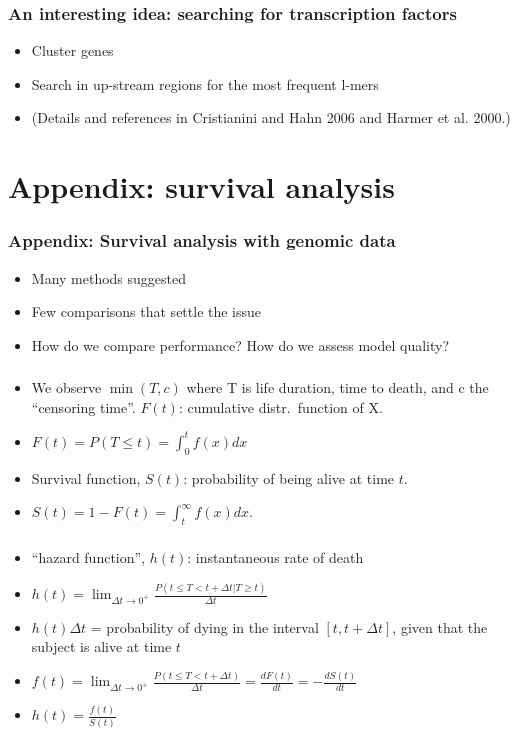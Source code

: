 \begin{frame}
\frametitle{An interesting idea: searching for transcription factors}
\begin{itemize}
\item Cluster genes
\item Search in up-stream regions for the most frequent l-mers

\item (Details and references in Cristianini and Hahn 2006 and Harmer et
  al. 2000.)
\end{itemize}
\end{frame}



\section{Appendix: survival analysis}
\begin{frame}[label=Survival]
\frametitle{Appendix: Survival analysis with genomic data}
\begin{itemize}
\item Many methods suggested
\item Few comparisons that settle the issue
\item How do we compare performance? How do we assess model quality?
\end{itemize}
\end{frame}



\begin{frame}
\frametitle{}
\begin{itemize}
\item We observe $\min (T, c)$ where T is life duration, time to death, and
  c the ``censoring time''. $F(t)$: cumulative distr.\
  function of X.
\item $F(t) = P(T \le t) = \int_0^t f(x) dx$
\item Survival function, $S(t)$:
  probability of being alive at time $t$. 
\item $S(t) = 1 - F(t) = \int_t^{\infty} f(x) dx$.
\end{itemize}
\end{frame}

\begin{frame}
\frametitle{}
\begin{itemize}
\item ``hazard function'', $h(t)$: instantaneous rate of death
\item $h(t) = \lim_{\Delta t \rightarrow 0^+} \frac{P(t \le T < t +
      \Delta t | T \ge t)}{\Delta t} $
\item $h(t) \Delta t$ = probability of dying in the interval
   $\left[t, t + \Delta t \right]$, given that the subject is alive at
   time  $t$
\item $f(t) = \lim_{\Delta t \rightarrow 0^+} 
\frac{P(t \le T < t + \Delta t)}{\Delta t} = 
\frac{dF(t)}{dt} = - \frac{dS(t)}{dt} $
\item $h(t) = \frac{f(t)}{S(t)}$
\end{itemize}
\end{frame}


